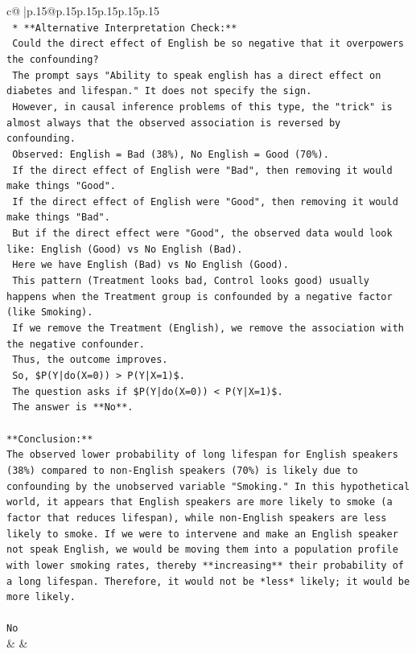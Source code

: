 \documentclass{article}
\begin{document}
{\begin{supertabular}{c@{$\;$}|p{.15\linewidth}@{}p{.15\linewidth}p{.15\linewidth}p{.15\linewidth}p{.15\linewidth}p{.15\linewidth}}
{{{\\ 
\texttt{    *   **Alternative Interpretation Check:**} \\
\texttt{        Could the direct effect of English be so negative that it overpowers the confounding?} \\
\texttt{        The prompt says "Ability to speak english has a direct effect on diabetes and lifespan." It does not specify the sign.} \\
\texttt{        However, in causal inference problems of this type, the "trick" is almost always that the observed association is reversed by confounding.} \\
\texttt{        Observed: English = Bad (38\%), No English = Good (70\%).} \\
\texttt{        If the direct effect of English were "Bad", then removing it would make things "Good".} \\
\texttt{        If the direct effect of English were "Good", then removing it would make things "Bad".} \\
\texttt{        But if the direct effect were "Good", the observed data would look like: English (Good) vs No English (Bad).} \\
\texttt{        Here we have English (Bad) vs No English (Good).} \\
\texttt{        This pattern (Treatment looks bad, Control looks good) usually happens when the Treatment group is confounded by a negative factor (like Smoking).} \\
\texttt{        If we remove the Treatment (English), we remove the association with the negative confounder.} \\
\texttt{        Thus, the outcome improves.} \\
\texttt{        So, \$P(Y|do(X=0)) > P(Y|X=1)\$.} \\
\texttt{        The question asks if \$P(Y|do(X=0)) < P(Y|X=1)\$.} \\
\texttt{        The answer is **No**.} \\
\\ 
\texttt{**Conclusion:**} \\
\texttt{The observed lower probability of long lifespan for English speakers (38\%) compared to non{-}English speakers (70\%) is likely due to confounding by the unobserved variable "Smoking." In this hypothetical world, it appears that English speakers are more likely to smoke (a factor that reduces lifespan), while non{-}English speakers are less likely to smoke. If we were to intervene and make an English speaker not speak English, we would be moving them into a population profile with lower smoking rates, thereby **increasing** their probability of a long lifespan. Therefore, it would not be *less* likely; it would be more likely.} \\
\\ 
\texttt{No} \\
            }
        }
    }
    & & \\ \\


\end{supertabular}}
\end{document}

